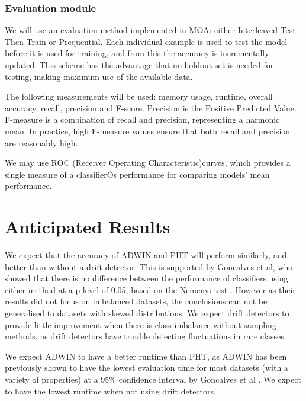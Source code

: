\documentclass[11pt]{article}\usepackage[]{graphicx}\usepackage[]{color}
\begin{document}
\subsubsection{Evaluation module}
We will use an evaluation method implemented in MOA: either Interleaved Test-Then-Train or Prequential. Each individual example is used to test the model before it is used for training, and from this the accuracy is incrementally updated. This scheme has the advantage that no holdout set is needed for testing, making maximum use of the available data.

The following measurements will be used: memory usage, runtime, overall accuracy, recall, precision and F-score. Precision is the Positive Predicted Value. F-measure is a combination of recall and precision, representing a harmonic mean. In practice, high F-measure values ensure that both recall and precision are reasonably high.

We may use ROC (Receiver Operating Characteristic)curves, which provides a single measure of a classifierÕs performance for comparing models' mean performance. 

\section{Anticipated Results}

We expect that the accuracy of ADWIN and PHT will perform similarly, and better than without a drift detector. This is supported by Goncalves et al, who showed that there is no difference between the performance of classifiers using either method at a p-level of 0.05, based on the Nemenyi test \cite{gonc14}. However as their results did not focus on imbalanced datasets, the conclusions can not be generalised to datasets with skewed distributions. We expect drift detectors to provide little improvement when there is class imbalance without sampling methods, as drift detectors have trouble detecting fluctuations in rare classes.

We expect ADWIN to have a better runtime than PHT, as ADWIN has been previously shown to have the lowest evaluation time for most datasets (with a variety of properties) at a 95\% confidence interval  by Goncalves et al \cite{gonc14}. We expect to have the lowest runtime when not using drift detectors.
\end{document}
